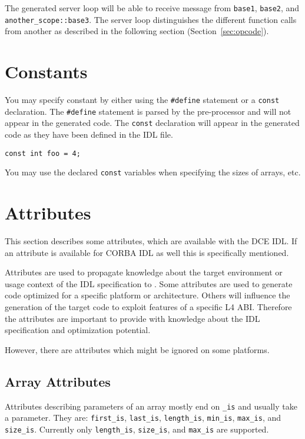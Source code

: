 The generated server loop will be able to receive message from \verb|base1|,
\verb|base2|, and \verb|another_scope::base3|. The server loop
distinguishes the different function calls from another as described
in the following section (Section~\ref{sec:opcode}).

\section{Constants}
You may specify constant by either using the \verb|#define| statement
or a {\tt const} declaration. The \verb|#define| statement is parsed
by the pre-processor and will not appear in the generated code. The
{\tt const} declaration will appear in the generated code as they have
been defined in the IDL file.

\begin{verbatim}
const int foo = 4;
\end{verbatim}

You may use the declared {\tt const} variables when specifying the sizes
of arrays, etc.

\section{Attributes}
\label{sec:attributes}

This section describes some attributes, which are available
with the DCE IDL. If an attribute is available for CORBA IDL as well
this is specifically mentioned.

Attributes are used to propagate knowledge about the target
environment or usage context of the IDL specification to \dice{}.
Some attributes are used to generate code optimized for a
specific platform or architecture. Others will influence the
generation of the target code to exploit features of a specific 
L4 ABI. Therefore the attributes are important to provide
\dice{} with knowledge about the IDL specification and optimization
potential.

However, there are attributes which might be ignored on some platforms.

\subsection{Array Attributes}
Attributes describing parameters of an array mostly end on
\verb|_is| and usually take a parameter. They are:
\verb|first_is|, \verb|last_is|, \verb|length_is|, \verb|min_is|,
\verb|max_is|, and \verb|size_is|. Currently only \verb|length_is|,
\verb|size_is|, and \verb|max_is| are supported.

